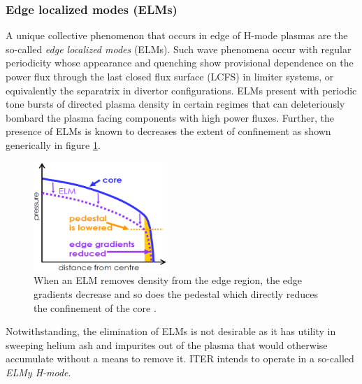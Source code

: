 \documentclass[11pt,titlepage]{report}
\begin{document}

\subsubsection{Edge localized modes (ELMs)}

\indent\indent A unique collective phenomenon that occurs in edge of H-mode plasmas are the so-called \emph{edge localized modes} (ELMs). Such wave phenomena occur with regular periodicity whose appearance and quenching show provisional dependence on the power flux through the last closed flux surface (LCFS) in limiter systems, or equivalently the separatrix in divertor configurations. ELMs present with periodic tone bursts of directed plasma density in certain regimes that can deleteriously bombard the plasma facing components with high power fluxes. Further, the presence of ELMs is known to decreases the extent of confinement as shown generically in figure \ref{fig:ELM_effecT_on_confinement}.

\begin{figure}[h!]
  \centering
    \includegraphics[width=0.45\textwidth]{graphics/ELM_effect_on_confinement}
  \caption{When an ELM removes density from the edge region, the edge gradients decrease and so does the pedestal which directly reduces the confinement of the core \cite{ConnorXX}.}
  \label{fig:ELM_effecT_on_confinement}
\end{figure}

\noindent Notwithstanding, the elimination of ELMs is not desirable as it has utility in sweeping helium ash and impurites out of the plasma that would otherwise accumulate without a means to remove it. ITER intends to operate in a so-called \emph{ELMy H-mode}. 
\end{document}
